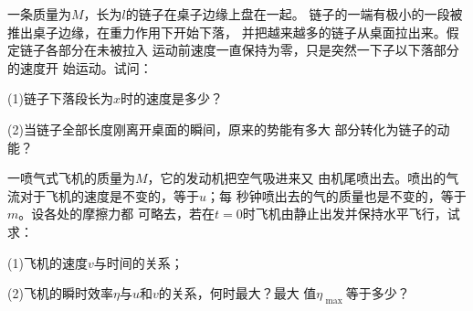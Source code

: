 \begin{exercises}
\exercise 一条质量为$ M $，长为$ l $的链子在桌子边缘上盘在一起。
链子的一端有极小的一段被推出桌子边缘，在重力作用下开始下落，
并把越来越多的链子从桌面拉出来。假定链子各部分在未被拉入
运动前速度一直保持为零，只是突然一下子以下落部分的速度开
始运动。试问：

(1)链子下落段长为$ x $时的速度是多少？

(2)当链子全部长度刚离开桌面的瞬间，原来的势能有多大
部分转化为链子的动能？

\exercise 一喷气式飞机的质量为$ M $，它的发动机把空气吸进来又
由机尾喷出去。喷出的气流对于飞机的速度是不变的，等于$ u $；每
秒钟喷出去的气的质量也是不变的，等于$ m $。设各处的摩擦力都
可略去，若在$ t = 0 $时飞机由静止出发并保持水平飞行，试求：

(1)飞机的速度$ v $与时间的关系；

(2)飞机的瞬时效率$ \eta $与$ u $和$ v $的关系，何时最大？最大
值$ \eta _ { \text { max } } $等于多少？

\end{exercises}
